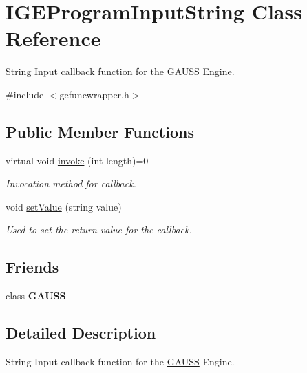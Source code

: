 \hypertarget{class_i_g_e_program_input_string}{}\section{I\+G\+E\+Program\+Input\+String Class Reference}
\label{class_i_g_e_program_input_string}


String Input callback function for the \hyperlink{class_g_a_u_s_s}{G\+A\+U\+SS} Engine.  




{\ttfamily \#include $<$gefuncwrapper.\+h$>$}

\subsection*{Public Member Functions}
\begin{DoxyCompactItemize}
\item 
virtual void \hyperlink{class_i_g_e_program_input_string_aff170652d98f6a992a27134a7c674e01}{invoke} (int length)=0
\begin{DoxyCompactList}\small\item\em Invocation method for callback. \end{DoxyCompactList}\item 
\mbox{\label{class_i_g_e_program_input_string_ac692d94b650c29fe8d82690c78003be6}} 
void \hyperlink{class_i_g_e_program_input_string_ac692d94b650c29fe8d82690c78003be6}{set\+Value} (string value)
\begin{DoxyCompactList}\small\item\em Used to set the return value for the callback. \end{DoxyCompactList}\end{DoxyCompactItemize}
\subsection*{Friends}
\begin{DoxyCompactItemize}
\item 
\mbox{\label{class_i_g_e_program_input_string_abc89e64d0ec6c939575c3125753c6309}} 
class {\bfseries G\+A\+U\+SS}
\end{DoxyCompactItemize}


\subsection{Detailed Description}
String Input callback function for the \hyperlink{class_g_a_u_s_s}{G\+A\+U\+SS} Engine. 


